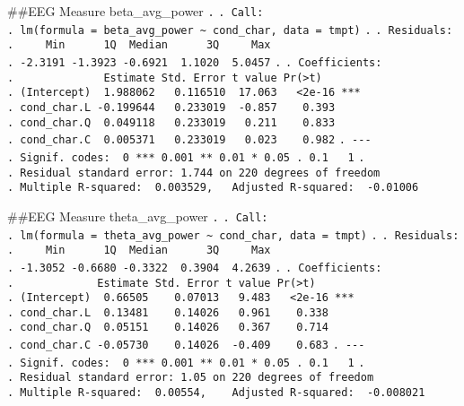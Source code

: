 \documentclass[
]{article}
\begin{document}
\#\#EEG Measure beta\_avg\_power \texttt{.} \texttt{.\ Call:}
\texttt{.\ lm(formula\ =\ beta\_avg\_power\ \textasciitilde{}\ cond\_char,\ data\ =\ tmpt)}
\texttt{.} \texttt{.\ Residuals:}
\texttt{.\ \ \ \ \ Min\ \ \ \ \ \ 1Q\ \ Median\ \ \ \ \ \ 3Q\ \ \ \ \ Max}
\texttt{.\ -2.3191\ -1.3923\ -0.6921\ \ 1.1020\ \ 5.0457} \texttt{.}
\texttt{.\ Coefficients:}
\texttt{.\ \ \ \ \ \ \ \ \ \ \ \ \ \ Estimate\ Std.\ Error\ t\ value\ Pr(\textgreater{}\textbar{}t\textbar{})}
\texttt{.\ (Intercept)\ \ 1.988062\ \ \ 0.116510\ \ 17.063\ \ \ \textless{}2e-16\ ***}
\texttt{.\ cond\_char.L\ -0.199644\ \ \ 0.233019\ \ -0.857\ \ \ \ 0.393}
\texttt{.\ cond\_char.Q\ \ 0.049118\ \ \ 0.233019\ \ \ 0.211\ \ \ \ 0.833}
\texttt{.\ cond\_char.C\ \ 0.005371\ \ \ 0.233019\ \ \ 0.023\ \ \ \ 0.982}
\texttt{.\ -\/-\/-}
\texttt{.\ Signif.\ codes:\ \ 0\ \textquotesingle{}***\textquotesingle{}\ 0.001\ \textquotesingle{}**\textquotesingle{}\ 0.01\ \textquotesingle{}*\textquotesingle{}\ 0.05\ \textquotesingle{}.\textquotesingle{}\ 0.1\ \textquotesingle{}\ \textquotesingle{}\ 1}
\texttt{.}
\texttt{.\ Residual\ standard\ error:\ 1.744\ on\ 220\ degrees\ of\ freedom}
\texttt{.\ Multiple\ R-squared:\ \ 0.003529,\ \ \ Adjusted\ R-squared:\ \ -0.01006}

\#\#EEG Measure theta\_avg\_power \texttt{.} \texttt{.\ Call:}
\texttt{.\ lm(formula\ =\ theta\_avg\_power\ \textasciitilde{}\ cond\_char,\ data\ =\ tmpt)}
\texttt{.} \texttt{.\ Residuals:}
\texttt{.\ \ \ \ \ Min\ \ \ \ \ \ 1Q\ \ Median\ \ \ \ \ \ 3Q\ \ \ \ \ Max}
\texttt{.\ -1.3052\ -0.6680\ -0.3322\ \ 0.3904\ \ 4.2639} \texttt{.}
\texttt{.\ Coefficients:}
\texttt{.\ \ \ \ \ \ \ \ \ \ \ \ \ Estimate\ Std.\ Error\ t\ value\ Pr(\textgreater{}\textbar{}t\textbar{})}
\texttt{.\ (Intercept)\ \ 0.66505\ \ \ \ 0.07013\ \ \ 9.483\ \ \ \textless{}2e-16\ ***}
\texttt{.\ cond\_char.L\ \ 0.13481\ \ \ \ 0.14026\ \ \ 0.961\ \ \ \ 0.338}
\texttt{.\ cond\_char.Q\ \ 0.05151\ \ \ \ 0.14026\ \ \ 0.367\ \ \ \ 0.714}
\texttt{.\ cond\_char.C\ -0.05730\ \ \ \ 0.14026\ \ -0.409\ \ \ \ 0.683}
\texttt{.\ -\/-\/-}
\texttt{.\ Signif.\ codes:\ \ 0\ \textquotesingle{}***\textquotesingle{}\ 0.001\ \textquotesingle{}**\textquotesingle{}\ 0.01\ \textquotesingle{}*\textquotesingle{}\ 0.05\ \textquotesingle{}.\textquotesingle{}\ 0.1\ \textquotesingle{}\ \textquotesingle{}\ 1}
\texttt{.}
\texttt{.\ Residual\ standard\ error:\ 1.05\ on\ 220\ degrees\ of\ freedom}
\texttt{.\ Multiple\ R-squared:\ \ 0.00554,\ \ \ \ Adjusted\ R-squared:\ \ -0.008021}
\end{document}
